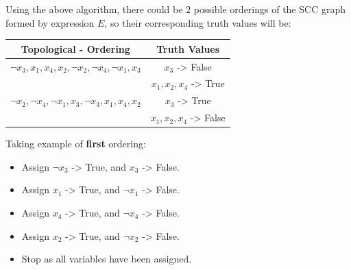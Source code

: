\documentclass{article}
\let\bold\textbf
\begin{document}
{{\begin{itemize}
\begin{itemize}
        \end{itemize}
    \end{itemize}
    Using the above algorithm, there could be $2$ possible orderings of the SCC graph formed by expression $E$, so their corresponding truth values will be:
    \begin{center}
    \begin{tabular}{|| c | c ||}
      \hline
      \bold{Topological - Ordering} & \bold{Truth Values} \\ [0.5ex]
      \hline \hline
      $\neg x_3,x_1,x_4,x_2,\neg x_2,\neg x_4,\neg x_1,x_3$ & $x_3$ -> False \\
      & $x_1,x_2,x_4$ -> True \\
      \hline
      $\neg x_2,\neg x_4, \neg x_1, x_3, \neg x_3, x_1, x_4, x_2$ & $x_3$ -> True \\
      & $x_1, x_2,x_4$ -> False \\
      \hline
    \end{tabular}
    \end{center}
    Taking example of \bold{first} ordering:
    \begin{itemize}
      \item{Assign $\neg x_3$ -> True, and $x_3$ -> False.}
      \item{Assign $x_1$ -> True, and $\neg x_1$ -> False.}
      \item{Assign $x_4$ -> True, and $\neg x_4$ -> False.}
      \item{Assign $x_2$ -> True, and $\neg x_2$ -> False.}
      \item{Stop as all variables have been assigned.}
    \end{itemize}
  }
}
\end{document}
